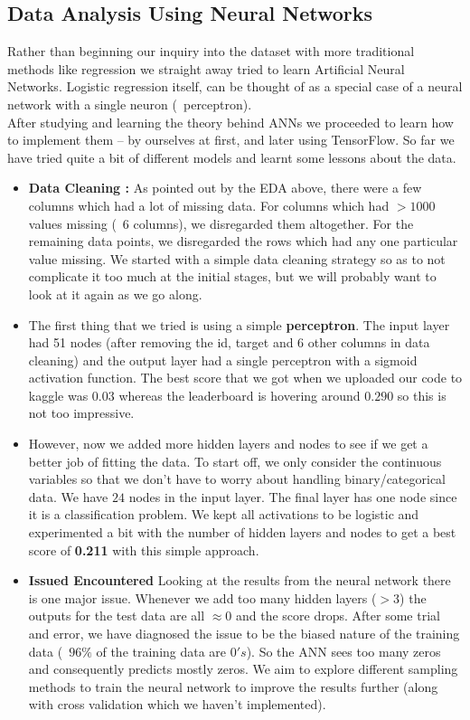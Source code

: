 \subsection{Data Analysis Using Neural Networks}
Rather than beginning our inquiry into the dataset with more traditional methods like regression we straight away tried to learn Artificial Neural Networks. Logistic regression itself, can be thought of as a special case of a neural network with a single neuron (~perceptron). 
\\
After studying and learning the theory behind ANNs we proceeded to learn how to implement them -- by ourselves at first, and later using TensorFlow. So far we have tried quite a bit of different models and learnt some lessons about the data.
\\
\begin{itemize}
\item \textbf{Data Cleaning :} As pointed out by the EDA above, there were a few columns which had a lot of missing data. For columns which had $>1000$ values missing (~6 columns), we disregarded them altogether. For the remaining data points, we disregarded the rows which had any one particular value missing. We started with a simple data cleaning strategy so as to not complicate it too much at the initial stages, but we will probably want to look at it again as we go along.

\item The first thing that we tried is using a simple \textbf{perceptron}. The input layer had 51 nodes (after removing the id, target and 6 other columns in data cleaning) and the output layer had a single perceptron with a sigmoid activation function. The best score that we got when we uploaded our code to kaggle was $0.03$ whereas the leaderboard is hovering around $0.290$ so this is not too impressive.

\item However, now we added more hidden layers and nodes to see if we get a better job of fitting the data. To start off, we only consider the continuous variables so that we don't have to worry about handling binary/categorical data. We have $24$ nodes in the input layer. The final layer has one node  since it is a classification problem. We kept all activations to be logistic and experimented a bit with the number of hidden layers and nodes to get a best score of \textbf{0.211} with this simple approach.

\item \textbf{Issued Encountered}  Looking at the results from the neural network there is one major issue. Whenever we add too many hidden layers ($>3$) the outputs for the test data are all $\approx 0$ and the score drops. After some trial and error, we have diagnosed the issue to be the biased nature of the training data (~$96\%$ of the training data are $0's$). So the ANN sees too many zeros and consequently predicts mostly zeros. We aim to explore different sampling methods to train the neural network to improve the results further (along with cross validation which we haven't implemented).
\end{itemize}


